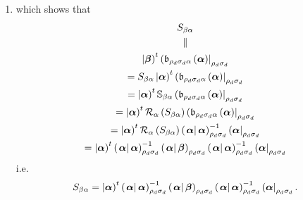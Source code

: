 \documentclass[aps,preprint]{revtex4}
\begin{document}
\begin{enumerate}
\begin{enumerate}
\begin{enumerate}
\item which shows that 
\begin{gather}
S_{\beta \alpha } \\
\parallel \\
\left\vert \boldsymbol{\beta }\right) ^{t}\left( \mathfrak{b}_{\rho
_{d}\sigma _{d}\alpha }\left( \boldsymbol{\alpha }\right) \right\vert _{\rho
_{d}\sigma _{d}} \\
=S_{\beta \alpha }\left\vert \boldsymbol{\alpha }\right) ^{t}\left( 
\mathfrak{b}_{\rho _{d}\sigma _{d}\alpha }\left( \boldsymbol{\alpha }\right)
\right\vert _{\rho _{d}\sigma _{d}} \\
=\left\vert \boldsymbol{\alpha }\right) ^{t}\mathbb{S}_{\beta \alpha }\left( 
\mathfrak{b}_{\rho _{d}\sigma _{d}\alpha }\left( \boldsymbol{\alpha }\right)
\right\vert _{\rho _{d}\sigma _{d}} \\
=\left\vert \boldsymbol{\alpha }\right) ^{t}\mathcal{R}_{\alpha }\left(
S_{\beta \alpha }\right) \left( \mathfrak{b}_{\rho _{d}\sigma _{d}\alpha
}\left( \boldsymbol{\alpha }\right) \right\vert _{\rho _{d}\sigma _{d}} \\
=\left\vert \boldsymbol{\alpha }\right) ^{t}\mathcal{R}_{\alpha }\left(
S_{\beta \alpha }\right) \left( \left. \boldsymbol{\alpha }\right\vert 
\boldsymbol{\alpha }\right) _{\rho _{d}\sigma _{d}}^{-1}\left( \boldsymbol{%
\alpha }\right\vert _{\rho _{d}\sigma _{d}} \\
=\left\vert \boldsymbol{\alpha }\right) ^{t}\left( \left. \boldsymbol{\alpha 
}\right\vert \boldsymbol{\alpha }\right) _{\rho _{d}\sigma _{d}}^{-1}\left(
\left. \boldsymbol{\alpha }\right\vert \boldsymbol{\beta }\right) _{\rho
_{d}\sigma _{d}}\left( \left. \boldsymbol{\alpha }\right\vert \boldsymbol{%
\alpha }\right) _{\rho _{d}\sigma _{d}}^{-1}\left( \boldsymbol{\alpha }%
\right\vert _{\rho _{d}\sigma _{d}}
\end{gather}%
i.e. 
\begin{equation}
S_{\beta \alpha }=\left\vert \boldsymbol{\alpha }\right) ^{t}\left( \left. 
\boldsymbol{\alpha }\right\vert \boldsymbol{\alpha }\right) _{\rho
_{d}\sigma _{d}}^{-1}\left( \left. \boldsymbol{\alpha }\right\vert 
\boldsymbol{\beta }\right) _{\rho _{d}\sigma _{d}}\left( \left. \boldsymbol{%
\alpha }\right\vert \boldsymbol{\alpha }\right) _{\rho _{d}\sigma
_{d}}^{-1}\left( \boldsymbol{\alpha }\right\vert _{\rho _{d}\sigma _{d}}.
\end{equation}
\end{enumerate}


\end{enumerate}
\end{enumerate}
\end{document}

